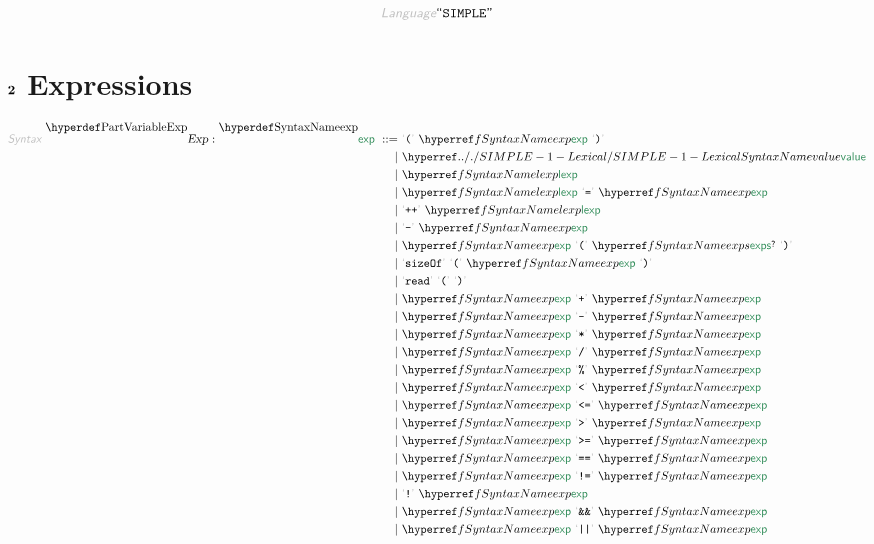 \begin{displaymath}
\KEY{Language} \STRING{SIMPLE}
\end{displaymath}

\section*{$\SECT{2}$ Expressions}\hypertarget{sect2-expressions}{}\label{sect2-expressions}

\begin{align*}
  \KEY{Syntax} ~ 
    \VARDECL{Exp} : \SYNDECL{exp}
      ~ ::= ~ &
      \LEX{(} ~ \SYNREF{exp} ~ \LEX{)} \\
      ~ \mid ~ &  \SYNHYPER{../.}{SIMPLE-1-Lexical}{value} \\
      ~ \mid ~ &  \SYNREF{lexp} \\
      ~ \mid ~ &  \SYNREF{lexp} ~ \LEX{={}} ~ \SYNREF{exp} \\
      ~ \mid ~ &  \LEX{+{}+{}} ~ \SYNREF{lexp} \\
      ~ \mid ~ &  \LEX{-{}} ~ \SYNREF{exp} \\
      ~ \mid ~ &  \SYNREF{exp} ~ \LEX{(} ~ \SYNREF{exps}\QUERY ~ \LEX{)} \\
      ~ \mid ~ &  \LEX{sizeOf} ~ \LEX{(} ~ \SYNREF{exp} ~ \LEX{)} \\
      ~ \mid ~ &  \LEX{read} ~ \LEX{(} ~ \LEX{)} \\
      ~ \mid ~ &  \SYNREF{exp} ~ \LEX{+{}} ~ \SYNREF{exp} \\
      ~ \mid ~ &  \SYNREF{exp} ~ \LEX{-{}} ~ \SYNREF{exp} \\
      ~ \mid ~ &  \SYNREF{exp} ~ \LEX{*{}} ~ \SYNREF{exp} \\
      ~ \mid ~ &  \SYNREF{exp} ~ \LEX{/{}} ~ \SYNREF{exp} \\
      ~ \mid ~ &  \SYNREF{exp} ~ \LEX{\PERCENT } ~ \SYNREF{exp} \\
      ~ \mid ~ &  \SYNREF{exp} ~ \LEX{<{}} ~ \SYNREF{exp} \\
      ~ \mid ~ &  \SYNREF{exp} ~ \LEX{<{}={}} ~ \SYNREF{exp} \\
      ~ \mid ~ &  \SYNREF{exp} ~ \LEX{>{}} ~ \SYNREF{exp} \\
      ~ \mid ~ &  \SYNREF{exp} ~ \LEX{>{}={}} ~ \SYNREF{exp} \\
      ~ \mid ~ &  \SYNREF{exp} ~ \LEX{={}={}} ~ \SYNREF{exp} \\
      ~ \mid ~ &  \SYNREF{exp} ~ \LEX{!{}={}} ~ \SYNREF{exp} \\
      ~ \mid ~ &  \LEX{!{}} ~ \SYNREF{exp} \\
      ~ \mid ~ &  \SYNREF{exp} ~ \LEX{\AMPERSAND \AMPERSAND } ~ \SYNREF{exp} \\
      ~ \mid ~ &  \SYNREF{exp} ~ \LEX{||} ~ \SYNREF{exp}
\end{align*}
